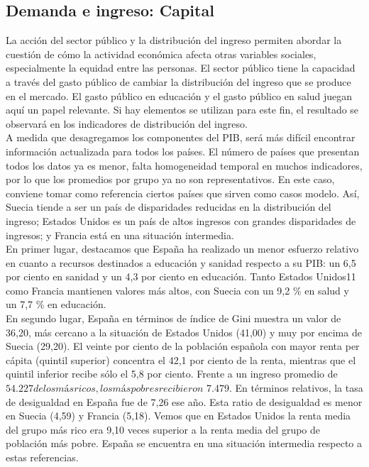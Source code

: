     \subsection{Demanda e ingreso: Capital}
    La acción del sector público y la distribución del ingreso permiten abordar la cuestión de cómo la actividad económica afecta otras variables sociales, especialmente la equidad entre las personas. El sector público tiene la capacidad a través del gasto público de cambiar la distribución del ingreso que se produce en el mercado. El gasto público en educación y el gasto público en salud juegan aquí un papel relevante. Si hay elementos se utilizan para este fin, el resultado se observará en los indicadores de distribución del ingreso.\\
    A medida que desagregamos los componentes del PIB, será más difícil encontrar información actualizada para todos los países. El número de países que presentan todos los datos ya es menor, falta homogeneidad temporal en muchos indicadores, por lo que los promedios por grupo ya no son representativos. En este caso, conviene tomar como referencia ciertos países que sirven como casos modelo. Así, Suecia tiende a ser un país de disparidades reducidas en la distribución del ingreso; Estados Unidos es un país de altos ingresos con grandes disparidades de ingresos; y Francia está en una situación intermedia.\\
    En primer lugar, destacamos que España ha realizado un menor esfuerzo relativo en cuanto a recursos destinados a educación y sanidad respecto a su PIB: un 6,5 por ciento en sanidad y un 4,3 por ciento en educación. Tanto Estados Unidos11 como Francia mantienen valores más altos, con Suecia con un 9,2  \% en salud y un 7,7 \% en educación.\\
    En segundo lugar, España en términos de índice de Gini muestra un valor de 36,20, más cercano a la situación de Estados Unidos (41,00) y muy por encima de Suecia (29,20). El veinte por ciento de la población española con mayor renta per cápita (quintil superior) concentra el 42,1 por ciento de la renta, mientras que el quintil inferior recibe sólo el 5,8 por ciento. Frente a un ingreso promedio de $ 54.227 de los más ricos, los más pobres recibieron $ 7.479. En términos relativos, la tasa de desigualdad en España fue de 7,26 ese año. Esta ratio de desigualdad es menor en Suecia (4,59) y Francia (5,18). Vemos que en Estados Unidos la renta media del grupo más rico era 9,10 veces superior a la renta media del grupo de población más pobre. España se encuentra en una situación intermedia respecto a estas referencias.
    

